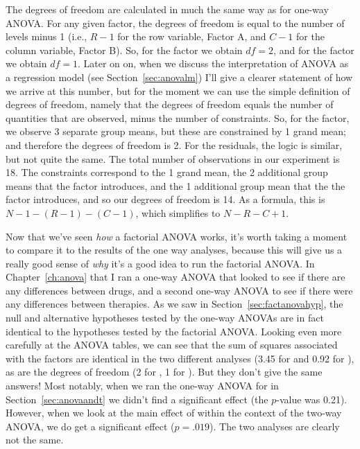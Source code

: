 
The degrees of freedom are calculated in much the same way as for one-way ANOVA. For any given factor, the degrees of freedom is equal to the number of levels minus 1 (i.e., $R-1$ for the row variable, Factor A, and $C-1$ for the column variable, Factor B). So, for the  factor we obtain $df = 2$, and for the  factor we obtain $df=1$. Later on on, when we discuss the interpretation of ANOVA as a regression model (see Section~\ref{sec:anovalm}) I'll give a clearer statement of how we arrive at this number, but for the moment we can use the simple definition of degrees of freedom, namely that the degrees of freedom equals the number of quantities that are observed, minus the number of constraints. So, for the  factor, we observe 3 separate group means, but these are constrained by 1 grand mean; and therefore the degrees of freedom is 2. For the residuals, the logic is similar, but not quite the same. The total number of observations in our experiment is 18. The constraints correspond to the 1 grand mean, the 2 additional group means that the  factor introduces, and the 1 additional group mean that the the  factor introduces, and so our degrees of freedom is 14. As a formula, this is $N-1 -(R-1)-(C-1)$, which simplifies to $N-R-C+1$.


Now that we've seen {\it how} a factorial ANOVA works, it's worth taking a moment to compare it to the results of the one way analyses, because this will give us a really good sense of {\it why} it's a good idea to run the factorial ANOVA. In Chapter~\ref{ch:anova} that I ran a one-way ANOVA that looked to see if there are any differences between drugs, and a second one-way ANOVA to see if there were any differences between therapies. As we saw in Section~\ref{sec:factanovahyp}, the null and alternative hypotheses tested by the one-way ANOVAs are in fact identical to the hypotheses tested by the factorial ANOVA. Looking even more carefully at the ANOVA tables, we can see that the sum of squares associated with the factors are identical in the two different analyses (3.45 for  and 0.92 for ), as are the degrees of freedom (2 for , 1 for ). But they don't give the same answers! Most notably, when we ran the one-way ANOVA for  in Section~\ref{sec:anovaandt} we didn't find a significant effect (the $p$-value was 0.21). However, when we look at the main effect of  within the context of the two-way ANOVA, we do get a significant effect ($p=.019$). The two analyses are clearly not the same.

